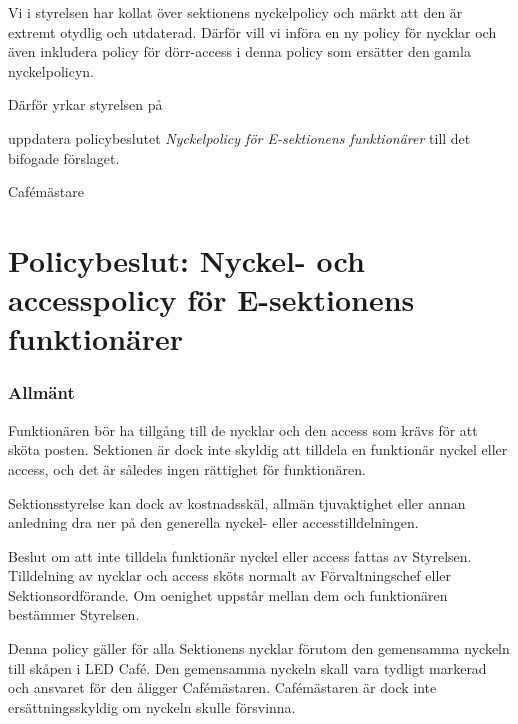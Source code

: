 \documentclass[../_main/handlingar.tex]{subfiles}
\begin{document}
Vi i styrelsen har kollat över sektionens nyckelpolicy och märkt att den är extremt otydlig och utdaterad. Därför vill vi införa en ny policy för nycklar och även inkludera policy för dörr-access i denna policy som ersätter den gamla nyckelpolicyn.

Därför yrkar styrelsen på

\begin{attsatser}
    \att uppdatera policybeslutet \emph{Nyckelpolicy för E-sektionens funktionärer} till det bifogade förslaget.
\end{attsatser}

\begin{signatures}{1}
    \ist
    \signature{Elin Johansson}{Cafémästare}
\end{signatures}

\newpage
\section*{Policybeslut: Nyckel- och accesspolicy för E-sektionens funktionärer}
\subsubsection*{Allmänt}
Funktionären bör ha tillgång till de nycklar och den access som krävs för att sköta posten. Sektionen är dock inte skyldig att tilldela en funktionär nyckel eller access, och det är således ingen rättighet för funktionären.

Sektionsstyrelse kan dock av kostnadsskäl, allmän tjuvaktighet eller annan anledning dra ner på den generella nyckel- eller accesstilldelningen.

Beslut om att inte tilldela funktionär nyckel eller access fattas av Styrelsen. Tilldelning av nycklar och access sköts normalt av Förvaltningschef eller Sektionsordförande. Om oenighet uppstår mellan dem och funktionären bestämmer Styrelsen.

Denna policy gäller för alla Sektionens nycklar förutom den gemensamma nyckeln till skåpen i LED Café. Den gemensamma nyckeln skall vara tydligt markerad och ansvaret för den åligger Cafémästaren. Cafémästaren är dock inte ersättningsskyldig om nyckeln skulle försvinna.
\end{document}
